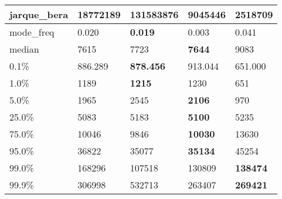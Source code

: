 \begin{table}[H]
\begin{tabular}{|l|m{10em}|m{10em}|m{10em}|m{10em}|}
\hline jarque\_bera & 18772189 & \cellcolor[rgb]{0.9, 0.54, 0.52} 131583876 & \bfseries 9045446 & 2518709 \\
\hline mode\_freq & 0.020 & \bfseries 0.019 & 0.003 & \cellcolor[rgb]{0.9, 0.54, 0.52} 0.041 \\
\hline median & 7615 & 7723 & \bfseries 7644 & \cellcolor[rgb]{0.9, 0.54, 0.52} 9083 \\
\hline 0.1\% & 886.289 & \bfseries 878.456 & 913.044 & \cellcolor[rgb]{0.9, 0.54, 0.52} 651.000 \\
\hline 1.0\% & 1189 & \bfseries 1215 & 1230 & \cellcolor[rgb]{0.9, 0.54, 0.52} 651 \\
\hline 5.0\% & 1965 & 2545 & \bfseries 2106 & \cellcolor[rgb]{0.9, 0.54, 0.52} 970 \\
\hline 25.0\% & 5083 & 5183 & \bfseries 5100 & \cellcolor[rgb]{0.9, 0.54, 0.52} 5235 \\
\hline 75.0\% & 10046 & 9846 & \bfseries 10030 & \cellcolor[rgb]{0.9, 0.54, 0.52} 13630 \\
\hline 95.0\% & 36822 & 35077 & \bfseries 35134 & \cellcolor[rgb]{0.9, 0.54, 0.52} 45254 \\
\hline 99.0\% & 168296 & \cellcolor[rgb]{0.9, 0.54, 0.52} 107518 & 130809 & \bfseries 138474 \\
\hline 99.9\% & 306998 & \cellcolor[rgb]{0.9, 0.54, 0.52} 532713 & 263407 & \bfseries 269421 \\
\hline
\end{tabular}
\end{table}
